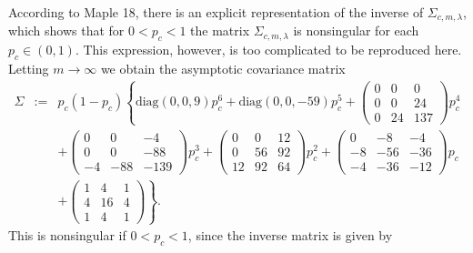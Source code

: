 \documentclass[12pt]{article}
\def\diag{\mbox{diag}}
\begin{document}
According to Maple 18, there is an explicit representation of the inverse of $\Sigma_{c,m,\lambda}$, which shows that
for $0<p_c<1$ the matrix $\Sigma_{c,m,\lambda}$ is nonsingular for each $p_c \in (0,1)$. This expression, however,  is too
complicated to be reproduced here.
Letting  $m\rightarrow\infty$ we obtain the asymptotic covariance matrix
\begin{eqnarray*}
\Sigma&:=&p_c(1-p_c) \left\{\diag(0,0,9)p_c^6+\diag(0,0,-59)p_c^5+\left(\begin{array}{ccc} 0 & 0 & 0\\ 0 & 0 & 24 \\ 0 & 24 & 137\end{array}\right)p_c^4 \right. \\
&& \left. +\left(\begin{array}{ccc} 0 & 0 & -4\\ 0 & 0 & -88 \\ -4 & -88 & -139\end{array}\right)p_c^3
+\left(\begin{array}{ccc} 0 & 0 & 12\\ 0 & 56 & 92 \\ 12 & 92 & 64\end{array}\right)p_c^2
+\left(\begin{array}{ccc} 0 & -8 & -4\\ -8 & -56 & -36 \\ -4 & -36 & -12\end{array}\right)p_c \right. \\
&& \left. +\left(\begin{array}{ccc} 1 & 4 & 1\\ 4 & 16 & 4 \\ 1 & 4 & 1\end{array}\right)\right\}.
\end{eqnarray*}
This is nonsingular if $0<p_c<1$, since the inverse matrix is given by
\end{document}
